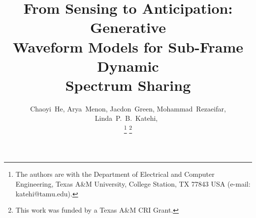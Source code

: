 \documentclass[lettersize,journal]{IEEEtran}
\begin{document}
\title{From Sensing to Anticipation: Generative   \\
Waveform Models for Sub-Frame Dynamic \\
Spectrum Sharing}

\author{Chaoyi~He,
        Arya~Menon,
        Jacdon~Green,
        Mohammad~Rezaeifar,
        Linda~P.~B.~Katehi,~%

\thanks{The authors are with the Department of Electrical and Computer
Engineering, Texas A\&M University, College Station, TX 77843 USA
(e-mail: katehi@tamu.edu).}
\thanks{This work was funded by a Texas A\&M CRI Grant.}}


\maketitle
\end{document}
